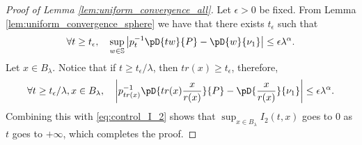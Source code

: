 \documentclass{article}
\numberwithin{equation}{section}
\newcommand{\sphere}{\mathbb{S}}
\newcommand{\coD}[2]{\pD{#1}{#2}}
\begin{document}
\begin{proof}[Proof of Lemma \ref{lem:uniform_convergence_all}]
    Let \(\epsilon>0\) be fixed. From Lemma
    \ref{lem:uniform_convergence_sphere} we have that
    there exists \(t_{\epsilon}\) such that
    \begin{equation*}
        \forall t\geq t_\epsilon,\quad \sup_{w\in\sphere}\left|
        p_t^{-1}\coD{tw}{P} - \coD{w}{\nu_1} \right|\leq \epsilon
        \lambda^{\alpha}.
    \end{equation*}
    Let \(x\in B_{\lambda}\). Notice that if \(t\geq
    t_\epsilon/\lambda\), then \(tr(x)\geq t_\epsilon\),
    therefore,
    \begin{equation*}
        \forall t\geq t_\epsilon/\lambda, x\in B_{\lambda},\quad
        \left|p_{tr(x)}^{-1}\coD{tr(x)\frac{x}{r(x)}}{P} -
        \coD{\frac{x}{r(x)}}{\nu_1}\right| \leq \epsilon\lambda^{\alpha}.
    \end{equation*}
    Combining this with \eqref{eq:control_I_2} shows that
    \(\sup_{x\in B_{\lambda}}{I_2(t,x)}\)
    goes to \(0\) as \(t\) goes to \(+\infty\), which completes the proof.
\end{proof}
\end{document}
